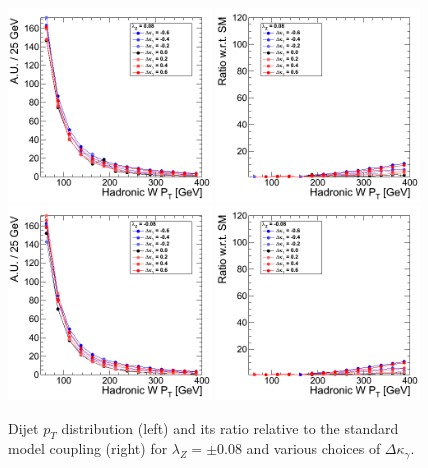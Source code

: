 \begin{figure}[h!t]
  {\centering
    \includegraphics[width=0.48\textwidth]{figs/HadronicWpT_008.png}
    \includegraphics[width=0.48\textwidth]{figs/HadronicWpT_008_ratio.png}
    \includegraphics[width=0.48\textwidth]{figs/HadronicWpT_m008.png}
    \includegraphics[width=0.48\textwidth]{figs/HadronicWpT_m008_ratio.png}
    \caption{Dijet $p_T$ distribution (left) and its ratio relative to 
    the standard model coupling (right) for $\lambda_Z = \pm 0.08$ and various choices of $\Delta{\kappa_\gamma}$.}
    \label{fig:ww_dijetPt_atgcRatio008}}
\end{figure}
